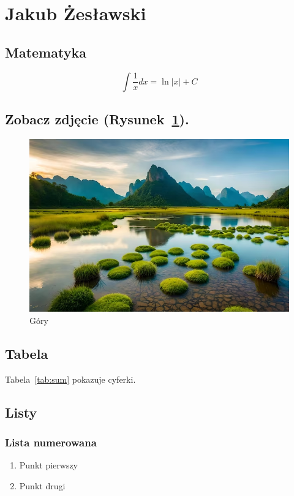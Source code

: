\section{Jakub Żesławski}

\subsection{Matematyka}
\begin{equation}
\int \frac{1}{x} dx = \ln |x|  + C
\end{equation} 


\subsection{Zobacz zdjęcie (Rysunek~\ref{fig:z}).}
\begin{figure}[htbp]
    \centering
    \includegraphics[scale=.4]{pictures/JZzdj.png}
    \caption{Góry}
    \label{fig:z}
\end{figure}


\subsection{Tabela}
Tabela~\ref{tab:sum} pokazuje cyferki.



\subsection{Listy}

\subsubsection{Lista numerowana}
\begin{enumerate}
  \item Punkt pierwszy
  \item Punkt drugi
\end{enumerate}

